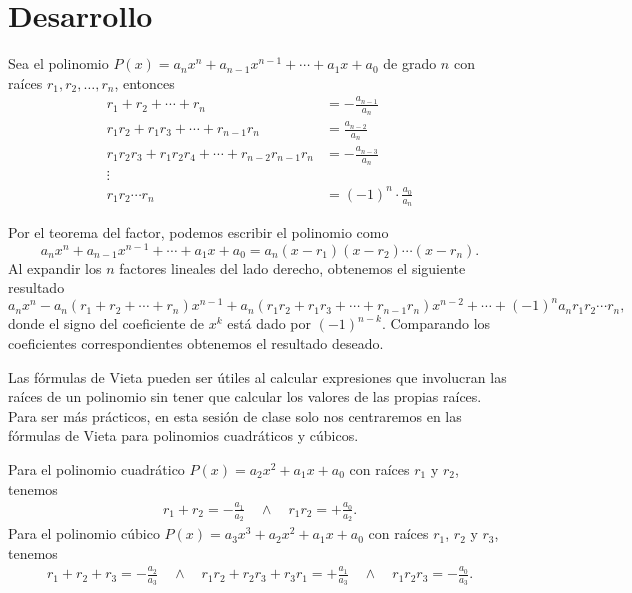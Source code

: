 \section{Desarrollo}

\begin{definition}
    Sea el polinomio $P(x) = a_n x^n + a_{n - 1} x^{n - 1} + \cdots  + a_1 x + a_0$ de grado $n$ con raíces $r_1, r_2, \ldots, r_n$,
    entonces
    \begin{align*}
        r_1 + r_2 + \cdots + r_n &= - \frac{a_{n - 1}}{a_n}\\
        r_1 r_2 + r_1 r_3 + \cdots + r_{n - 1} r_n &= \frac{a_{n - 2}}{a_n}\\
        r_1 r_2 r_3 + r_1 r_2 r_4 + \cdots + r_{n - 2} r_{n - 1} r_n &= -\frac{a_{n - 3}}{a_n}\\
        \vdots\\
        r_1 r_2 \cdots r_n &= (-1)^n \cdot \frac{a_0}{a_n}
    \end{align*}
\end{definition}

Por el teorema del factor, podemos escribir el polinomio como
\[
    a_n x^n + a_{n - 1} x^{n - 1} + \cdots  + a_1 x + a_0 = a_n (x - r_1)(x - r_2) \cdots (x - r_n).
\]
Al expandir los $n$ factores lineales del lado derecho, obtenemos el siguiente resultado
\[
    a_n x^n - a_n(r_1 + r_2 + \cdots + r_n)x^{n - 1} + a_n(r_1 r_2 + r_1 r_3 + \cdots + r_{n - 1} r_n)x^{n - 2} + \cdots + (-1)^n a_n r_1 r_2 \cdots r_n,
\]
donde el signo del coeficiente de $x^k$ está dado por $(-1)^{n - k}$.
Comparando los coeficientes correspondientes obtenemos el resultado deseado.

Las fórmulas de Vieta pueden ser útiles al calcular expresiones que involucran las raíces de un polinomio sin tener que calcular los valores de las propias raíces.
Para ser más prácticos, en esta sesión de clase solo nos centraremos en las fórmulas de Vieta para polinomios cuadráticos y cúbicos.

\begin{remark.tcb}
    Para el polinomio cuadrático $P(x) = a_2 x^2 + a_1 x + a_0$ con raíces $r_1$ y $r_2$, tenemos
    \begin{align*}
        r_1 + r_2 = - \frac{a_1}{a_2} \quad \land \quad
        r_1 r_2 = +\frac{a_0}{a_2}.
    \end{align*}
    Para el polinomio cúbico $P(x) = a_3 x^3 + a_2 x^2 + a_1 x + a_0$ con raíces $r_1$, $r_2$ y $r_3$, tenemos
    \begin{align*}
        r_1 + r_2 + r_3 = - \frac{a_2}{a_3} \quad \land \quad
        r_1 r_2 + r_2 r_3 + r_3 r_1 = +\frac{a_1}{a_3} \quad \land \quad
        r_1 r_2 r_3 = - \frac{a_0}{a_3}.
    \end{align*}
\end{remark.tcb}

